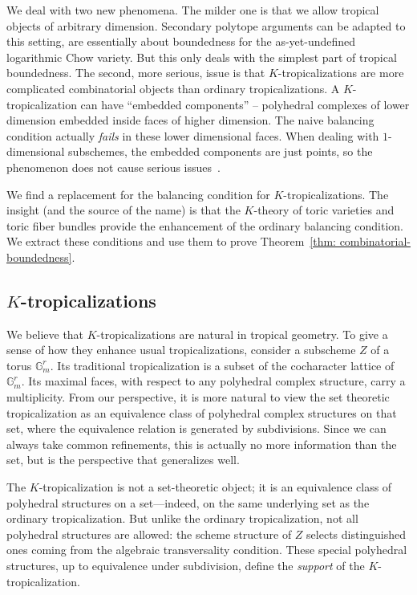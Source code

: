\documentclass[11pt]{amsart}
\theoremstyle{definition}
\theoremstyle{definition}
\begin{document}
We deal with two new phenomena. The milder one is that we allow tropical objects of arbitrary dimension. Secondary polytope arguments can be adapted to this setting, are essentially about boundedness for the as-yet-undefined logarithmic Chow variety. But this only deals with the simplest part of tropical boundedness. The second, more serious, issue is that $K$-tropicalizations are more complicated combinatorial objects than ordinary tropicalizations. A $K$-tropicalization can have ``embedded components'' -- polyhedral complexes of lower dimension embedded inside faces of higher dimension. The naive balancing condition actually {\it fails} in these lower dimensional faces. When dealing with $1$-dimensional subschemes, the embedded components are just points, so the phenomenon does not cause serious issues~\cite{LiWu,MR20}. 

We find a replacement for the balancing condition for $K$-tropicalizations. The insight (and the source of the name) is that the $K$-theory of toric varieties and toric fiber bundles provide the enhancement of the ordinary balancing condition. We extract these conditions and use them to prove Theorem~\ref{thm: combinatorial-boundedness}.

\subsection{$K$-tropicalizations} We believe that $K$-tropicalizations are natural in tropical geometry. To give a sense of how they enhance usual tropicalizations, consider a subscheme $Z$ of a torus $\mathbb G_m^r$. Its traditional tropicalization is a subset of the cocharacter lattice of $\mathbb G_m^r$. Its maximal faces, with respect to any polyhedral complex structure, carry a multiplicity. From our perspective, it is more natural to view the set theoretic tropicalization as an equivalence class of polyhedral complex structures on that set, where the equivalence relation is generated by subdivisions. Since we can always take common refinements, this is actually no more information than the set, but is the perspective that generalizes well.

The $K$-tropicalization is not a set-theoretic object; it is an equivalence class of polyhedral structures on a set---indeed, on the same underlying set as the ordinary tropicalization. But unlike the ordinary tropicalization, not all polyhedral structures are allowed: the scheme structure of $Z$ selects distinguished ones coming from the algebraic transversality condition. These special polyhedral structures, up to equivalence under subdivision, define the \emph{support} of the $K$-tropicalization. 
\end{document}
